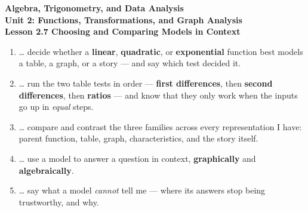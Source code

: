 \documentclass[10pt]{article}
\begin{document}
\vspace{-0.8in}

\begin{center}
  {\color{white}\textbf{\LARGE Algebra, Trigonometry, and Data Analysis}}\\[4pt]
  {\color{mistmid}\large\textbf{Unit 2: Functions, Transformations, and Graph Analysis}}\\[6pt]
  {\color{white}\textbf{\large Lesson 2.7 \quad Choosing and Comparing Models in Context}}
\end{center}

\vspace{0.22in}
\namedateperiod
\vspace{0.18in}

\begin{learningtargetbox}
\small
\begin{enumerate}[leftmargin=1.5em, itemsep=5pt]
  \item \ldots{} decide whether a \textbf{linear}, \textbf{quadratic}, or \textbf{exponential}
        function best models a table, a graph, or a story --- and say which test decided it.
  \item \ldots{} run the two table tests in order --- \textbf{first differences}, then
        \textbf{second differences}, then \textbf{ratios} --- and know that they only work when the
        inputs go up in \emph{equal} steps.
  \item \ldots{} compare and contrast the three families across every representation I have: parent
        function, table, graph, characteristics, and the story itself.
  \item \ldots{} use a model to answer a question in context, \textbf{graphically} and
        \textbf{algebraically}.
  \item \ldots{} say what a model \emph{cannot} tell me --- where its answers stop being
        trustworthy, and why.
\end{enumerate}
\end{learningtargetbox}

\vspace{0.14in}
\end{document}
